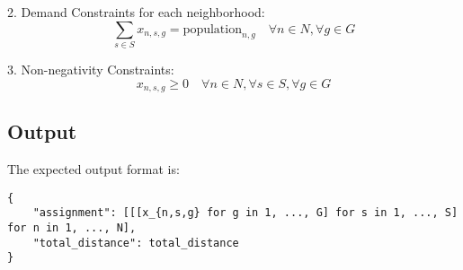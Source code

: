 \documentclass{article}
\begin{document}
2. Demand Constraints for each neighborhood:
\[
\sum_{s \in S} x_{n,s,g} = \text{population}_{n,g} \quad \forall n \in N, \forall g \in G
\]

3. Non-negativity Constraints:
\[
x_{n,s,g} \geq 0 \quad \forall n \in N, \forall s \in S, \forall g \in G
\]

\subsection*{Output}
The expected output format is:
\begin{verbatim}
{
    "assignment": [[[x_{n,s,g} for g in 1, ..., G] for s in 1, ..., S] for n in 1, ..., N],
    "total_distance": total_distance
}
\end{verbatim}
\end{document}
